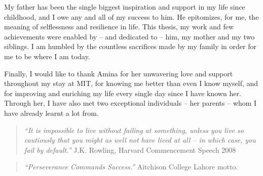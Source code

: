 My father has been the single biggest inspiration and support in my life since childhood, 
and I owe any and all of my success to him. He epitomizes, for me, the meaning of selflessness and resilience in life. 
This thesis, my work and few achievements were enabled by -- and dedicated to -- him, my mother and my two siblings.
I am humbled by the countless sacrifices made by my family in order for me to be where I am today.

Finally, I would like to thank Amina for her unwavering love and support throughout my stay at MIT, 
for knowing me better than even I know myself, and for improving and enriching my life every 
single day since I have known her. Through her, I have also met two exceptional individuals -- her parents --  
whom I have already learnt a lot from. \newline 

\begin{quote}
\emph{``It is impossible to live without failing at something, unless you live so cautiously that you might as well not have
lived at all -- in which case, you fail by default.''} \newline
J.K. Rowling, Harvard Commencement Speech 2008
\end{quote}

\begin{quote}
\emph{``Perseverance Commands Success.''} \newline
Aitchison College Lahore motto.
\end{quote}

